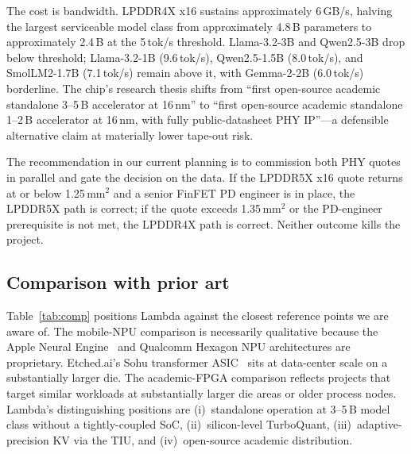 \documentclass[conference]{IEEEtran}
\begin{document}
The cost is bandwidth. LPDDR4X x16 sustains approximately 6\,GB/s, halving the largest serviceable model class from approximately 4.8\,B parameters to approximately 2.4\,B at the 5\,tok/s threshold. Llama-3.2-3B and Qwen2.5-3B drop below threshold; Llama-3.2-1B (9.6\,tok/s), Qwen2.5-1.5B (8.0\,tok/s), and SmolLM2-1.7B (7.1\,tok/s) remain above it, with Gemma-2-2B (6.0\,tok/s) borderline. The chip's research thesis shifts from ``first open-source academic standalone 3--5\,B accelerator at 16\,nm'' to ``first open-source academic standalone 1--2\,B accelerator at 16\,nm, with fully public-datasheet PHY IP''---a defensible alternative claim at materially lower tape-out risk.

The recommendation in our current planning is to commission both PHY quotes in parallel and gate the decision on the data. If the LPDDR5X x16 quote returns at or below 1.25\,mm$^2$ and a senior FinFET PD engineer is in place, the LPDDR5X path is correct; if the quote exceeds 1.35\,mm$^2$ or the PD-engineer prerequisite is not met, the LPDDR4X path is correct. Neither outcome kills the project.

\subsection{Comparison with prior art}

Table~\ref{tab:comp} positions Lambda against the closest reference points we are aware of. The mobile-NPU comparison is necessarily qualitative because the Apple Neural Engine~\cite{apple_foundation} and Qualcomm Hexagon NPU architectures are proprietary. Etched.ai's Sohu transformer ASIC~\cite{etched_sohu} sits at data-center scale on a substantially larger die. The academic-FPGA comparison reflects projects that target similar workloads at substantially larger die areas or older process nodes. Lambda's distinguishing positions are (i)~standalone operation at 3--5\,B model class without a tightly-coupled SoC, (ii)~silicon-level TurboQuant, (iii)~adaptive-precision KV via the TIU, and (iv)~open-source academic distribution.
\end{document}
